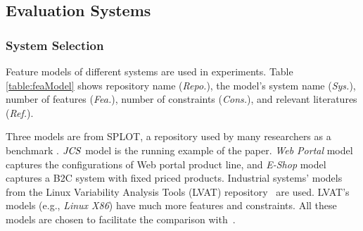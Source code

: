 




\subsection{Evaluation Systems}\label{sec:cases}

\subsubsection{System Selection}\label{subsecc:featuremodelsetup}

Feature models of different systems are used in experiments. Table \ref{table:feaModel} shows  repository name (\emph{Repo.}),  the model's system name (\emph{Sys.}), number of features (\emph{Fea.}),  number of constraints (\emph{Cons.}), and relevant literatures (\emph{Ref.}).


Three models are from SPLOT, a repository used by many researchers as a benchmark \cite{DBLP:conf/oopsla/MendoncaBC091}. $\mathit{JCS}$ model is the running example of the paper. %
\emph{Web Portal} model captures the configurations of Web portal product line, and \emph{E-Shop} model %
captures a B2C system with fixed priced products. %
Industrial systems' models from the Linux Variability Analysis Tools (LVAT) repository~\cite{LVAT} are used. %
LVAT's models (e.g., \emph{Linux X86}) have  much more features and constraints.
All these models are chosen to facilitate the comparison with~\cite{DBLP:conf/icse/SayyadMA13}\cite{DBLP:conf/issta/TanXCSLD15}\cite{DBLP:journals/asc/XueZT0CC016}.

